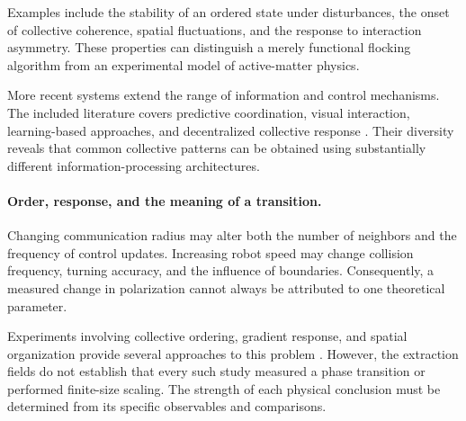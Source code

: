 Examples include the stability of an ordered
state under disturbances, the onset of
collective coherence, spatial fluctuations,
and the response to interaction asymmetry.
These properties can distinguish a merely
functional flocking algorithm from an
experimental model of active-matter physics.

More recent systems extend the range of
information and control mechanisms.
The included literature covers predictive
coordination, visual interaction,
learning-based approaches, and
decentralized collective response
\cite{Schilling2019learningvisionbase,Brandsttter2022multiagentspatial,Lee2022distributedcohesive,Gao2023robustdistributedc,Baumann2024hybridflockforma,Karagzel2024selforganizedflock,Horyna2024fastswarmingofuav,Zheng2024emergenceofcollect,Liu2024optimizationbasedf,Wu2024adversarialimitatio,Li2025llmflockdecentral,Tan2025goflockgoalorien,Zhang2025learningefficientf,Zheng2025shapingcollectiveb,Choi2026communicationfreec,Jond2026positionbasedflock}.
Their diversity reveals that common collective
patterns can be obtained using substantially
different information-processing architectures.



\paragraph*{Order, response, and the meaning of a transition.}



Changing communication radius may alter
both the number of neighbors and the
frequency of control updates. Increasing
robot speed may change collision frequency,
turning accuracy, and the influence
of boundaries. Consequently, a measured
change in polarization cannot always
be attributed to one theoretical parameter.

Experiments involving collective ordering,
gradient response, and spatial organization
provide several approaches to this problem
\cite{Ferrante2013aselfadaptivecomm,Karagzel2022collectivegradient,Lee2022distributeddeformab,PliegoJimnez2023flockingandformati,Chen2024synchronousandfull,Zheng2024bodyorientationcha,Verdoucq2025flockingphasetrans,Zhou2025activesearchpromot,PitaRomero2026flockingbehaviorfo,Rezeck2026decentralizedemerge,Yan2026flockingbehaviorfo}.
However, the extraction fields do not establish
that every such study measured a phase
transition or performed finite-size scaling.
The strength of each physical conclusion
must be determined from its specific
observables and comparisons.

